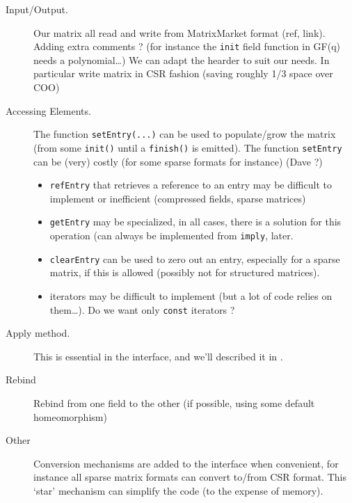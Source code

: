 \begin{description}
%
	\item[Input/Output.] Our matrix all read and write from MatrixMarket
		format (ref, link).  Adding extra comments ? (for instance the
		{\tt init} field function in GF(q) needs a polynomial\ldots) We
		can adapt the hearder to suit our needs. In particular write
		matrix in CSR fashion (saving roughly 1/3 space over COO)
%
	\item[Accessing Elements.] The function \texttt{setEntry(...)} can be
		used to populate/grow the matrix (from some \texttt{init()}
		until a \texttt{finish()} is emitted).  The function
		\texttt{setEntry} can be (very) costly (for some sparse formats
		for instance) (Dave ?)
%
		\begin{itemize}
			\item \texttt{refEntry} that retrieves a reference to
				an entry may be difficult to implement or
				inefficient (compressed fields, sparse
				matrices)
			\item \texttt{getEntry} may be specialized, in all
				cases, there is a solution for this operation
				(can always be implemented from \texttt{imply},
				\cf{} later.
			\item \texttt{clearEntry} can be used to zero out an
				entry, especially for a sparse matrix, if this
				is allowed (possibly not for structured
				matrices).
			\item iterators may be difficult to implement (but a
				lot of code relies on them\ldots). Do we want
				only {\tt const} iterators ?
%
		\end{itemize}
%
	\item[Apply method.]
		This is essential in the \applin interface, and we'll described
		it in .
%
	\item[Rebind] Rebind from one field to the other (if possible, using some default homeomorphism)
%
	\item[Other] Conversion mechanisms are added to the interface when
		convenient, for instance all sparse matrix formats can convert
		to/from CSR format. This `star' mechanism can simplify the code
		(to the expense of memory).
%
\end{description}
%
